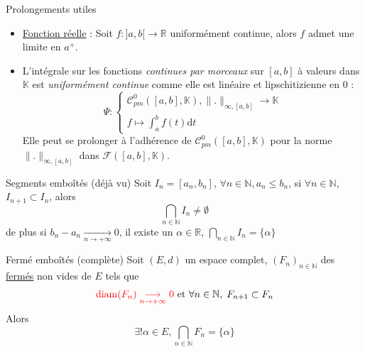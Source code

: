 \begin{Example}{Prolongements utiles}{}
\begin{itemize}

  \item \underline{Fonction réelle} : Soit $f : ]a, b[ \to \mathbb{R}$ uniformément continue, alors $f$ admet une limite en $a ^{+}$. 
  \item L'intégrale sur les fonctions \textit{continues par morceaux} sur $[a, b]$ à valeurs dans $\mathbb{K}$ est \textit{uniformément continue} comme elle est linéaire et lipschitizienne en 0 : 
    \[
      \Psi : \begin{cases}
        \mathscr{C} ^{0}_{pm} ([a,b], \mathbb{K}), \| . \| _{\infty, [a,b]} \to \mathbb{K} \\ 
        f \mapsto \int_a ^{b} f(t) \mathrm{d} t
      \end{cases}
    \]
    Elle peut se prolonger à l'adhérence de $\mathscr{C} _{pm} ^{0} ([a,b], \mathbb{K})$ pour la norme $\| . \|_{\infty, [a,b]}$ dans $\mathcal{F}([a,b], \mathbb{K})$.

\end{itemize}
\end{Example}

\begin{Prop}{Segments emboîtés (déjà vu)}{}
  Soit $I_n = [a_n,b_n]$, $\forall n \in \mathbb{N}, a_n \le b_n$, si $\forall n\in \mathbb{N}$, $I_{n+1} \subset I_n$, alors 
  \[
    \bigcap _{n \in \mathbb{N}} I_n \ne \emptyset
  \]
  de plus si  $b_n - a_n  \underset{n \to + \infty}{\longrightarrow} 0$, il existe un $\alpha \in \mathbb{R}$, $\bigcap _{n \in \mathbb{N}} I_n = \{ \alpha \}$
\end{Prop}


\begin{Theorem}{Fermé emboîtés (complète)}{}
  Soit $(E, d)$ un espace complet, $(F_n) _{n\in \mathbb{N}}$ des \underline{fermés} non vides de $E$ tels que 
\[
  {\color{red}\mathrm{diam}(F_n)  \underset{n \to + \infty}{\longrightarrow}  0} \text{ et } \forall n \in \mathbb{N},\; F _{n+1} \subset F_n
\]
Alors 
\[
  \exists ! \alpha \in E, \bigcap _{n \in \mathbb{N}} F_n = \{ \alpha\}
\]
\end{Theorem}

